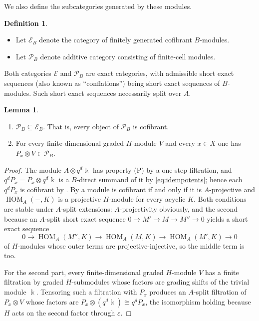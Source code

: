 \documentclass[11pt]{article}
\theoremstyle{definition}
\newtheorem{lem}[thm]{Lemma}
\newtheorem{defn}[thm]{Definition}
\numberwithin{equation}{section}
\def\mc{\mathcal}
\newcommand{\kk}{\Bbbk}
\newcommand{\Pun}{\mathcal{P}_B}
\newcommand{\HomA}{\operatorname{HOM}_A}
\newcommand{\Ecat}{\mathcal{E}_B}
\begin{document}
We also define the subcategories generated by these modules.

\begin{defn}
\begin{itemize}
    \item[(1)] Let $\Ecat$ denote the category of finitely generated cofibrant $B$-modules.
    \item[(2)] Let $\Pun$ denote additive category consisting of finite-cell modules.
    \end{itemize}
\end{defn}
  

Both categories $\mc{E}$ and $\Pun$ are exact categories, with admissible short exact sequences (also known as ``conflations'') being short exact sequences of $B$-modules. Such short exact sequences necessarily split over $A$. 



\begin{lem}\label{lem:Pun-property}
\begin{enumerate}
    \item[(i)] $\Pun\subseteq \Ecat$.  That is, every object of $\Pun$ is cofibrant.
    \item[(ii)] For every finite-dimensional graded $H$-module $V$ and every $x\in X$ one has $P_x\otimes V\in\Pun$.  
\end{enumerate}

\end{lem}

\begin{proof}
The module $A\otimes q^d\kk$ has property (P) by a one-step filtration, and $q^dP_x=P_x\otimes q^d\kk$ is a $B$-direct summand of it by \eqref{eq:idempotents}; hence each $q^dP_x$ is cofibrant by \cite[Corollary 6.8]{QYHopf}.  By \cite[Corollary 6.9]{QYHopf} a module is cofibrant if and only if it is $A$-projective and $\HomA(-,K)$ is a projective $H$-module for every acyclic $K$.  Both conditions are stable under $A$-split extensions: $A$-projectivity obviously, and the second because an $A$-split short exact sequence $0\to M'\to M\to M''\to0$ yields a short exact sequence
\[
0\to\HomA(M'',K)\to\HomA(M,K)\to\HomA(M',K)\to0
\]
of $H$-modules whose outer terms are projective-injective, so the middle term is too. 

For the second part, every finite-dimensional graded $H$-module $V$ has a finite filtration by graded $H$-submodules whose factors are grading shifts of the trivial module $\kk$.  Tensoring such a filtration with $P_x$ produces an $A$-split filtration of $P_x\otimes V$ whose factors are $P_x\otimes (q^d\kk)\cong q^dP_x$, the isomorphism holding because $H$ acts on the second factor through $\varepsilon$.

\end{proof}
\end{document}
